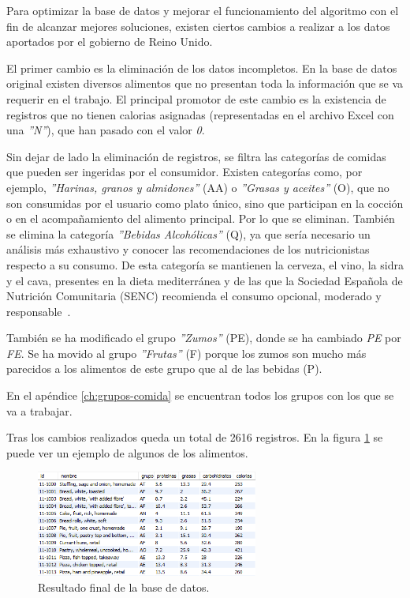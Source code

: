 Para optimizar la base de datos y mejorar el funcionamiento del algoritmo con el fin de alcanzar mejores soluciones, existen ciertos cambios a realizar a los datos aportados por el gobierno de Reino Unido.

El primer cambio es la eliminación de los datos incompletos. En la base de datos original existen diversos alimentos que no presentan toda la información que se va requerir en el trabajo. El principal promotor de este cambio es la existencia de registros que no tienen calorias asignadas (representadas en el archivo Excel con una \textit{''N''}), que han pasado con el valor \textit{0}.

Sin dejar de lado la eliminación de registros, se filtra las categorías de comidas que pueden ser ingeridas por el consumidor. Existen categorías como, por ejemplo, \textit{''Harinas, granos y almidones''} (AA) o \textit{''Grasas y aceites''} (O), que no son consumidas por el usuario como plato único, sino que participan en la cocción o en el acompañamiento del alimento principal. Por lo que se eliminan. También se elimina la categoría \textit{''Bebidas Alcohólicas''} (Q), ya que sería necesario un análisis más exhaustivo y conocer las recomendaciones de los nutricionistas respecto a su consumo. De esta categoría se mantienen la cerveza, el vino, la sidra y el cava, presentes en la dieta mediterránea y de las que la Sociedad Española de Nutrición Comunitaria (SENC) recomienda el consumo opcional, moderado y responsable~\cite{senpiramide}.

También se ha modificado el grupo \textit{''Zumos''} (PE), donde se ha cambiado \textit{PE} por \textit{FE}. Se ha movido al grupo \textit{''Frutas''} (F) porque los zumos son mucho más parecidos a los alimentos de este grupo que al de las bebidas (P).

En el apéndice \ref{ch:grupos-comida} se encuentran todos los grupos con los que se va a trabajar.

Tras los cambios realizados queda un total de 2616 registros. En la figura \ref{fig:ejemplo} se puede ver un ejemplo de algunos de los alimentos.

\begin{figure}[H]
    \centering
    \includegraphics[width=0.65\textwidth]{figures/ejemplo.png}
    \caption{Resultado final de la base de datos.}
    \label{fig:ejemplo}
\end{figure}

